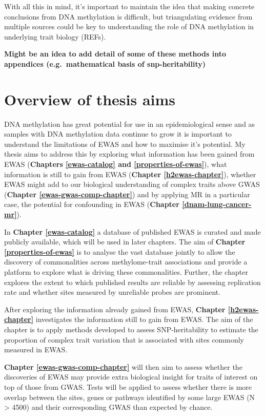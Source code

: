\documentclass[11pt,twoside]{bristolthesis}
\begin{document}
With all this in mind, it's important to maintain the idea that making concrete conclusions from DNA methylation is difficult, but triangulating evidence from multiple sources could be key to understanding the role of DNA methylation in underlying trait biology (REFs).

\textbf{Might be an idea to add detail of some of these methods into appendices (e.g.~mathematical basis of snp-heritability)}

\hypertarget{overview-of-thesis-aims}{%
\section{Overview of thesis aims}\label{overview-of-thesis-aims}}

DNA methylation has great potential for use in an epidemiological sense and as samples with DNA methylation data continue to grow it is important to understand the limitations of EWAS and how to maximise it's potential. My thesis aims to address this by exploring what information has been gained from EWAS (\textbf{Chapters \ref{ewas-catalog} and \ref{properties-of-ewas}}), what information is still to gain from EWAS (\textbf{Chapter \ref{h2ewas-chapter}}), whether EWAS might add to our biological understanding of complex traits above GWAS (\textbf{Chapter \ref{ewas-gwas-comp-chapter}}) and by applying MR in a particular case, the potential for confounding in EWAS (\textbf{Chapter \ref{dnam-lung-cancer-mr}}).

In \textbf{Chapter \ref{ewas-catalog}} a database of published EWAS is curated and made publicly available, which will be used in later chapters. The aim of \textbf{Chapter \ref{properties-of-ewas}} is to analyse the vast database jointly to allow the discovery of commonalities across methylome-trait associations and provide a platform to explore what is driving these commonalities. Further, the chapter explores the extent to which published results are reliable by assessing replication rate and whether sites measured by unreliable probes are prominent.

After exploring the information already gained from EWAS, \textbf{Chapter \ref{h2ewas-chapter}} investigates the information still to gain from EWAS. The aim of the chapter is to apply methods developed to assess SNP-heritability to estimate the proportion of complex trait variation that is associated with sites commonly measured in EWAS.

\textbf{Chapter \ref{ewas-gwas-comp-chapter}} will then aim to assess whether the discoveries of EWAS may provide extra biological insight for traits of interest on top of those from GWAS. Tests will be applied to assess whether there is more overlap between the sites, genes or pathways identified by some large EWAS (N \textgreater{} 4500) and their corresponding GWAS than expected by chance.
\end{document}
